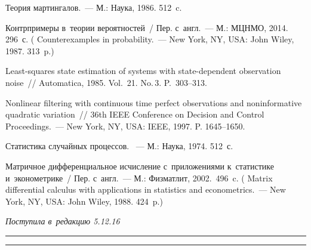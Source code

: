 \begin{multicols}{2}
{{\begin{thebibliography}{99}

 Теория мартингалов.~--- 
М.: Наука, 1986. 512~c.


 Контрпримеры в~теории вероятностей~/
Пер. с~англ.~--- М.: МЦНМО, 2014. 296~с.
(  
{Counterexamples in probability.}~--- New York, NY, USA: John Wiley, 1987. 313~p.)



Least-squares state estimation of systems with state-dependent observation noise~// 
Automatica, 1985. Vol.~21. No.\,3. P.~303--313.

    Nonlinear filtering with continuous time
perfect observations and noninformative quadratic variation~// 
36th IEEE Conference on Decision and Control Proceedings.~--- 
New York, NY, USA: IEEE, 1997. P. 1645--1650.
   
 Статистика случайных процессов. ~--- 
М.: Наука, 1974. 512~с.

Матричное дифференциальное исчисление с~приложениями к~статистике и~эконометрике~/
Пер. с~англ.~--- 
М.: Физматлит, 2002.~496~c.
(  
{Matrix differential calculus with applications in statistics and econometrics.}~--- 
New York, NY, USA: John Wiley, 1988. 424~p.)

 \end{thebibliography}

 }
 }

\end{multicols}

\vspace*{-3pt}

\hfill{\small\textit{Поступила в~редакцию 5.12.16}}

\vspace*{8pt}



\hrule

\vspace*{2pt}

\hrule




